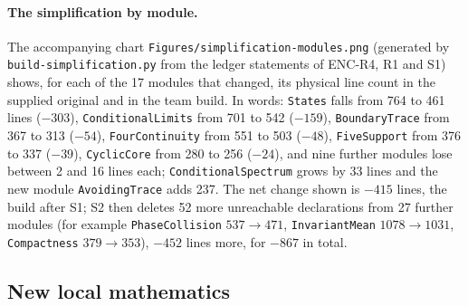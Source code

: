 \documentclass[11pt]{article}
\theoremstyle{definition}
\theoremstyle{remark}
\begin{document}
\paragraph{The simplification by module.} The accompanying chart \texttt{Figures/\allowbreak{}simplification-\allowbreak{}modules.png} (generated by \texttt{build-\allowbreak{}simplification.py} from the ledger statements of ENC-R4, R1 and S1) shows, for each of the 17 modules that changed, its physical line count in the supplied original and in the team build. In words: \texttt{States} falls from 764 to 461 lines ($-303$), \texttt{ConditionalLimits} from 701 to 542 ($-159$), \texttt{BoundaryTrace} from 367 to 313 ($-54$), \texttt{FourContinuity} from 551 to 503 ($-48$), \texttt{FiveSupport} from 376 to 337 ($-39$), \texttt{CyclicCore} from 280 to 256 ($-24$), and nine further modules lose between 2 and 16 lines each; \texttt{ConditionalSpectrum} grows by 33 lines and the new module \texttt{AvoidingTrace} adds 237. The net change shown is $-415$ lines, the build after S1; S2 then deletes 52 more unreachable declarations from 27 further modules (for example \texttt{PhaseCollision} $537\to471$, \texttt{InvariantMean} $1078\to1031$, \texttt{Compactness} $379\to353$), $-452$ lines more, for $-867$ in total.

\subsection{New local mathematics}
\end{document}
